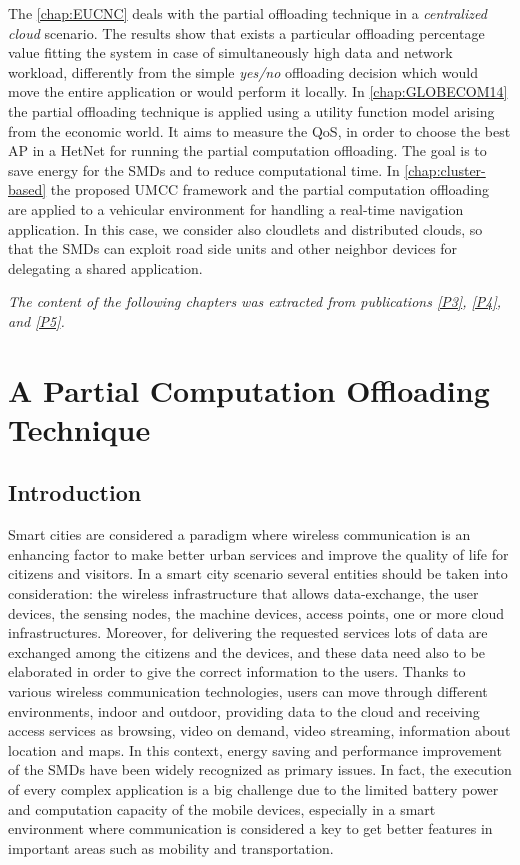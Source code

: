 \documentclass[twoside,openright]{report}
\begin{document}
The \autoref{chap:EUCNC} deals with the partial offloading technique in a \emph{centralized cloud} scenario.
The results show that exists a particular offloading percentage value fitting the system in case of simultaneously high data and network workload, differently from the simple \emph{yes/no} offloading decision which would move the entire application or would perform it locally. 
In \autoref{chap:GLOBECOM14} the partial offloading technique is applied using a utility function model arising from the economic world. It aims to measure the \gls{QoS}, in order to choose the best \gls{AP} in a \gls{HetNet} for running the partial computation offloading. The goal is to save energy for the \glspl{SMD} and to reduce computational time. 
In \autoref{chap:cluster-based} the proposed \gls{UMCC} framework and the partial computation offloading are applied to a vehicular environment for handling a real-time navigation application. In this case, we consider also cloudlets and distributed clouds, so that the \glspl{SMD} can exploit road side units and other neighbor devices for delegating a shared application.

\vspace{1cm}
\textit{The content of the following chapters was extracted from publications \hyperref[P3]{[P3]},  \hyperref[P4]{[P4]}, and \hyperref[P5]{[P5]}.}

\chapter[A Partial Computation Offloading Technique]{A Partial Computation Offloading\\ Technique}
\label{chap:EUCNC}
\section{Introduction}
Smart cities are considered a paradigm where wireless communication is an enhancing factor to make better urban services and improve the quality of life for citizens and visitors. 
In a smart city scenario several entities should be taken into consideration: the wireless infrastructure that allows data-exchange, the user devices, the sensing nodes, the machine devices, access points, one or more cloud infrastructures. 
Moreover, for delivering the requested services lots of data are exchanged among the citizens and the devices, and these data need also to be elaborated in order to give the correct information to the users.
Thanks to various wireless communication technologies, users can move through different environments, indoor and outdoor, providing data to the cloud and receiving access services as browsing, video on demand, video streaming, information about location and maps. 
In this context, energy saving and performance improvement of the \glspl{SMD} have been widely recognized as primary issues. 
In fact, the execution of every complex application is a big challenge due to the limited battery power and computation capacity of the mobile devices, especially in a smart environment where communication is considered a key to get better features in important areas such as mobility and transportation. 
\end{document}
